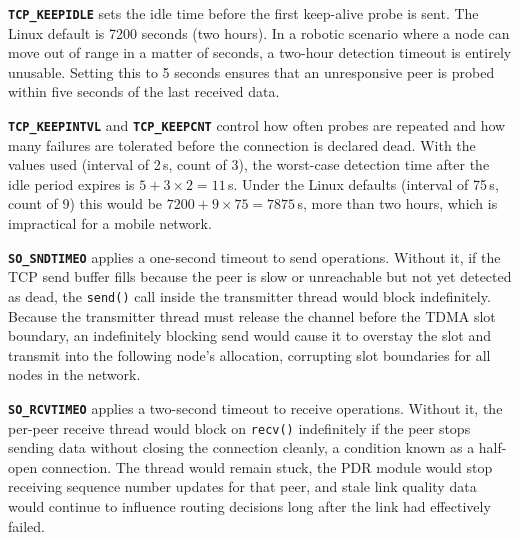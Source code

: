 \textbf{\texttt{TCP\_KEEPIDLE}} sets the idle time before the first keep-alive probe is sent.
The Linux default is 7200 seconds (two hours). In a robotic scenario where a node can move
out of range in a matter of seconds, a two-hour detection timeout is entirely unusable. Setting
this to 5 seconds ensures that an unresponsive peer is probed within five seconds of the last
received data.

\textbf{\texttt{TCP\_KEEPINTVL}} and \textbf{\texttt{TCP\_KEEPCNT}} control how often probes
are repeated and how many failures are tolerated before the connection is declared dead. With
the values used (interval of 2\,s, count of 3), the worst-case detection time after the idle
period expires is $5 + 3 \times 2 = 11$\,s. Under the Linux defaults (interval of 75\,s, count
of 9) this would be $7200 + 9 \times 75 = 7875$\,s, more than two hours, which is
impractical for a mobile network.

\textbf{\texttt{SO\_SNDTIMEO}} applies a one-second timeout to send operations. Without it,
if the TCP send buffer fills because the peer is slow or unreachable but not yet detected as
dead, the \texttt{send()} call inside the transmitter thread would block indefinitely. Because the
transmitter thread must release the channel before the TDMA slot boundary, an indefinitely
blocking send would cause it to overstay the slot and transmit into the following node's
allocation, corrupting slot boundaries for all nodes in the network.

\textbf{\texttt{SO\_RCVTIMEO}} applies a two-second timeout to receive operations. Without
it, the per-peer receive thread would block on \texttt{recv()} indefinitely if the peer stops
sending data without closing the connection cleanly, a condition known as a half-open
connection. The thread would remain stuck, the PDR module would stop receiving sequence
number updates for that peer, and stale link quality data would continue to influence routing
decisions long after the link had effectively failed.



